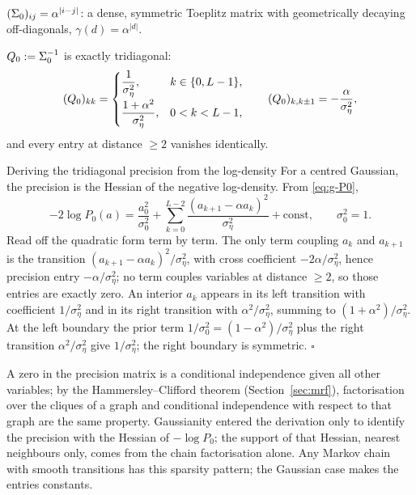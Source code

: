 \begin{proposition}\label{prop:g-Sigma0}
$(\Sigma_0)_{ij} = \alpha^{|i-j|}$: a dense, symmetric Toeplitz matrix with
geometrically decaying off-diagonals, $\gamma(d) = \alpha^{|d|}$.
\end{proposition}

\begin{proposition}\label{prop:g-Q0}
$Q_0 := \Sigma_0^{-1}$ is exactly tridiagonal:
\begin{equation}
  (Q_0)_{kk} =
  \begin{cases}
    \dfrac{1}{\sigma_\eta^2}, & k \in \{0, L-1\},\\[8pt]
    \dfrac{1+\alpha^2}{\sigma_\eta^2}, & 0 < k < L-1,
  \end{cases}
  \qquad
  (Q_0)_{k, k\pm 1} = -\frac{\alpha}{\sigma_\eta^2},
  \label{eq:g-Q0}
\end{equation}
and every entry at distance $\geq 2$ vanishes identically.
\end{proposition}

\begin{toolbox}{Deriving the tridiagonal precision from the log-density}
For a centred Gaussian, the precision is the Hessian of the negative
log-density. From \eqref{eq:g-P0},
\begin{equation*}
  -2 \log P_0(a)
  = \frac{a_0^2}{\sigma_0^2}
  + \sum_{k=0}^{L-2} \frac{(a_{k+1} - \alpha a_k)^2}{\sigma_\eta^2}
  + \text{const},
  \qquad \sigma_0^2 = 1 .
\end{equation*}
Read off the quadratic form term by term. The only term coupling $a_k$ and
$a_{k+1}$ is the transition $(a_{k+1} - \alpha a_k)^2/\sigma_\eta^2$, with
cross coefficient $-2\alpha/\sigma_\eta^2$, hence precision entry
$-\alpha/\sigma_\eta^2$; no term couples variables at distance $\geq 2$,
so those entries are exactly zero. An interior $a_k$ appears in its left
transition with coefficient $1/\sigma_\eta^2$ and in its right transition
with $\alpha^2/\sigma_\eta^2$, summing to $(1+\alpha^2)/\sigma_\eta^2$. At
the left boundary the prior term $1/\sigma_0^2 = (1-\alpha^2)/\sigma_\eta^2$
plus the right transition $\alpha^2/\sigma_\eta^2$ give $1/\sigma_\eta^2$;
the right boundary is symmetric. \hfill$\square$
\end{toolbox}

\begin{remark}
\label{rmk:g-markov-sparsity}
A zero in the precision matrix is a conditional independence given all
other variables; by the Hammersley--Clifford theorem
(Section~\ref{sec:mrf}), factorisation over the cliques of a graph and
conditional independence with respect to that graph are the same property.
Gaussianity entered the derivation only to identify the precision with the
Hessian of $-\log P_0$; the support of that Hessian, nearest neighbours
only, comes from the chain factorisation alone. Any Markov chain with
smooth transitions has this sparsity pattern; the Gaussian case makes the
entries constants.
\end{remark}

